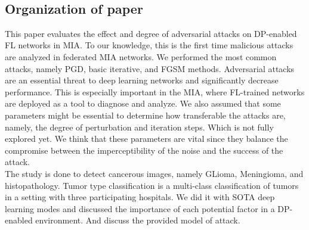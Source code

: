 



\\
\subsection{Organization of paper}


This paper evaluates the effect and degree of adversarial attacks on DP-enabled FL networks in MIA. To our knowledge, this is the first time malicious attacks are analyzed in federated MIA networks. We performed the most common attacks, namely PGD, basic iterative, and FGSM methods. Adversarial attacks are an essential threat to deep learning networks and significantly decrease performance. This is especially important in the MIA, where FL-trained networks are deployed as a tool to diagnose and analyze. We also assumed that some parameters might be essential to determine how transferable the attacks are, namely, the degree of perturbation and iteration steps. Which is not fully explored yet. We think that these parameters are vital since they balance the compromise between the imperceptibility of the noise and the success of the attack.\\ The study is done to detect cancerous images, namely GLioma, Meningioma, and histopathology. Tumor type classification is a multi-class classification of tumors in a setting with three participating hospitals. We did it with SOTA deep learning modes and discussed the importance of each potential factor in a DP-enabled environment. And discuss the provided model of attack.



